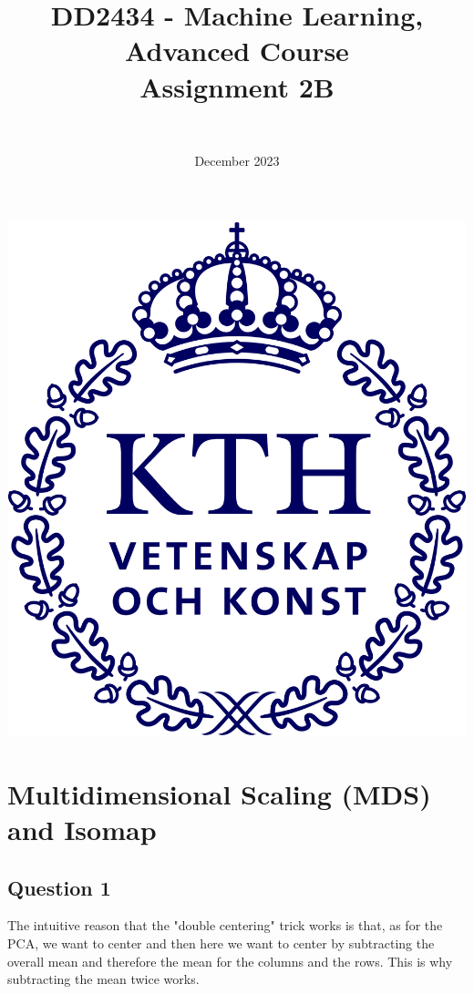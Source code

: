 \documentclass{article}
\title{DD2434 - Machine Learning, Advanced Course \\ Assignment 2B}
\author{\authorFst \\ \emailFst}
\date{December 2023}
\begin{document}
\maketitle

\begin{center}
  \includegraphics[scale=0.5]{KTH_logo_RGB_bla.png}
\end{center}

\thispagestyle{empty}

\newpage
\tableofcontents
\newpage

\section{Multidimensional Scaling (MDS) and Isomap}

\subsection{Question 1}
The intuitive reason that the "double centering" trick works is that, as for the PCA, we want to center and then here we want to center by subtracting the overall mean and therefore the mean for the columns and the rows. This is why subtracting the mean twice works.
\end{document}
